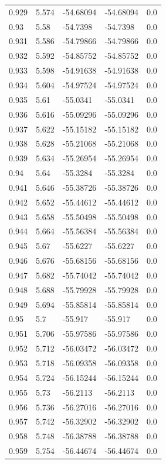 \begin{tabular}{lllll}
0.929 & 5.574 & -54.68094 & -54.68094 & 0.0 \\
0.93 & 5.58 & -54.7398 & -54.7398 & 0.0 \\
0.931 & 5.586 & -54.79866 & -54.79866 & 0.0 \\
0.932 & 5.592 & -54.85752 & -54.85752 & 0.0 \\
0.933 & 5.598 & -54.91638 & -54.91638 & 0.0 \\
0.934 & 5.604 & -54.97524 & -54.97524 & 0.0 \\
0.935 & 5.61 & -55.0341 & -55.0341 & 0.0 \\
0.936 & 5.616 & -55.09296 & -55.09296 & 0.0 \\
0.937 & 5.622 & -55.15182 & -55.15182 & 0.0 \\
0.938 & 5.628 & -55.21068 & -55.21068 & 0.0 \\
0.939 & 5.634 & -55.26954 & -55.26954 & 0.0 \\
0.94 & 5.64 & -55.3284 & -55.3284 & 0.0 \\
0.941 & 5.646 & -55.38726 & -55.38726 & 0.0 \\
0.942 & 5.652 & -55.44612 & -55.44612 & 0.0 \\
0.943 & 5.658 & -55.50498 & -55.50498 & 0.0 \\
0.944 & 5.664 & -55.56384 & -55.56384 & 0.0 \\
0.945 & 5.67 & -55.6227 & -55.6227 & 0.0 \\
0.946 & 5.676 & -55.68156 & -55.68156 & 0.0 \\
0.947 & 5.682 & -55.74042 & -55.74042 & 0.0 \\
0.948 & 5.688 & -55.79928 & -55.79928 & 0.0 \\
0.949 & 5.694 & -55.85814 & -55.85814 & 0.0 \\
0.95 & 5.7 & -55.917 & -55.917 & 0.0 \\
0.951 & 5.706 & -55.97586 & -55.97586 & 0.0 \\
0.952 & 5.712 & -56.03472 & -56.03472 & 0.0 \\
0.953 & 5.718 & -56.09358 & -56.09358 & 0.0 \\
0.954 & 5.724 & -56.15244 & -56.15244 & 0.0 \\
0.955 & 5.73 & -56.2113 & -56.2113 & 0.0 \\
0.956 & 5.736 & -56.27016 & -56.27016 & 0.0 \\
0.957 & 5.742 & -56.32902 & -56.32902 & 0.0 \\
0.958 & 5.748 & -56.38788 & -56.38788 & 0.0 \\
0.959 & 5.754 & -56.44674 & -56.44674 & 0.0 \\

\end{tabular}
